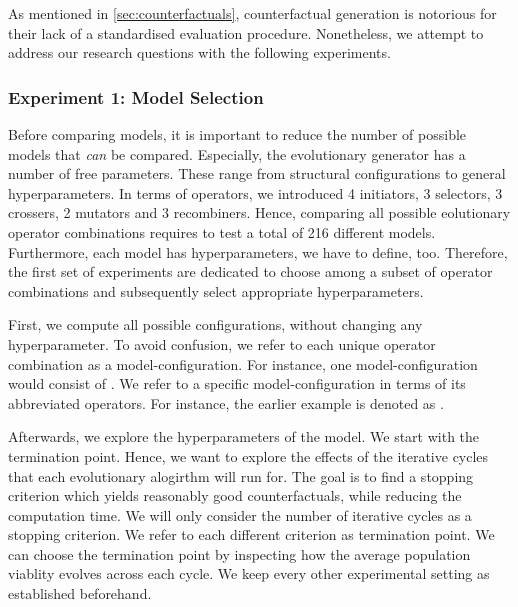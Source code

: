 \documentclass[./../../paper.tex]{subfiles}
\begin{document}
As mentioned in \autoref{sec:counterfactuals}, counterfactual generation is notorious for their lack of a standardised evaluation procedure. Nonetheless, we attempt to address our research questions with the following experiments.

\subsubsection{Experiment 1: Model Selection}
Before comparing models, it is important to reduce the number of possible models that \emph{can} be compared. Especially, the evolutionary generator has a number of free parameters. These range from structural configurations to general hyperparameters. In terms of operators, we introduced 4 initiators, 3 selectors, 3 crossers, 2 mutators and 3 recombiners. Hence, comparing all possible eolutionary operator combinations requires to test a total of 216 different models. Furthermore, each model has hyperparameters, we have to define, too. Therefore, the first set of experiments are dedicated to choose among a subset of operator combinations and subsequently select appropriate hyperparameters.  

First, we compute all possible configurations, without changing any hyperparameter. To avoid confusion, we refer to each unique operator combination as a model-configuration. For instance, one model-configuration would consist of . We refer to a specific model-configuration in terms of its abbreviated operators. For instance, the earlier example is denoted as .

Afterwards, we explore the hyperparameters of the model. We start with the termination point. Hence, we want to explore the effects of the iterative cycles that each evolutionary alogirthm will run for.  The goal is to find a stopping criterion which yields reasonably good counterfactuals, while reducing the computation time. We will only consider the number of iterative cycles as a stopping criterion. We refer to each different criterion as termination point. We can choose the termination point by inspecting how the average population viablity evolves across each cycle. We keep every other experimental setting as established beforehand.

\end{document}
